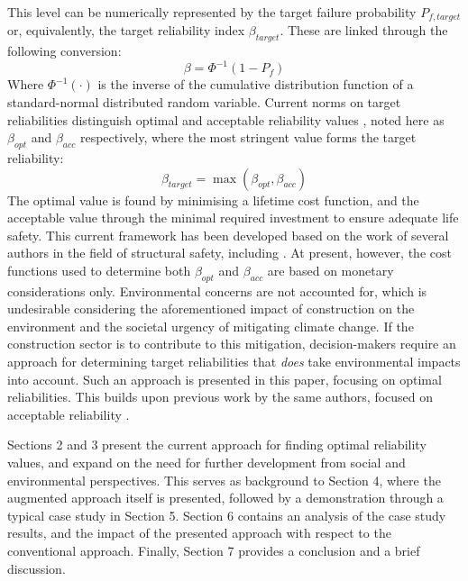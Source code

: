 This level can be numerically represented by the target failure probability $P_{f,target}$ or, equivalently, the target reliability index $\beta_{target}$.
These are linked through the following conversion:
\begin{equation}
\label{eqn:beta_Pf}
    \beta = \Phi^{-1}(1-P_f)
\end{equation}
Where $\Phi^{-1}(\cdot)$ is the inverse of the cumulative distribution function of a standard-normal distributed random variable.
Current norms on target reliabilities \citep{iso2394, EN1990} distinguish optimal and acceptable reliability values \citep{Fischer2019OptimalDesign}, noted here as $\beta_{opt}$ and $\beta_{acc}$ respectively, where the most stringent value forms the target reliability:
\begin{equation}
    \beta_{target} = \max(\beta_{opt}, \beta_{acc})
\end{equation}
The optimal value is found by minimising a lifetime cost function, and the acceptable value through the minimal required investment to ensure adequate life safety.
This current framework has been developed based on the work of several authors in the field of structural safety, including \citep{Rackwitz2000OptimizationVerification, Rackwitz2006TheCriteria, Rackwitz2008TheVerification, Viljoen2012DerivingLQI, Fischer2019OptimalDesign, Pandey2004LifeSafety, Pandey2024LifeStructures}.
At present, however, the cost functions used to determine both $\beta_{opt}$ and $\beta_{acc}$ are based on monetary considerations only.
Environmental concerns are not accounted for, which is undesirable considering the aforementioned impact of construction on the environment and the societal urgency of mitigating climate change.
If the construction sector is to contribute to this mitigation, decision-makers require an approach for determining target reliabilities that \emph{does} take environmental impacts into account.
Such an approach is presented in this paper, focusing on optimal reliabilities.
This builds upon previous work by the same authors, focused on acceptable reliability \citep{Knibbe2026PlaceHolder}. 

Sections 2 and 3 present the current approach for finding optimal reliability values, and expand on the need for further development from social and environmental perspectives.
This serves as background to Section 4, where the augmented approach itself is presented, followed by a demonstration through a typical case study in Section 5.
Section 6 contains an analysis of the case study results, and the impact of the presented approach with respect to the conventional approach.
Finally, Section 7 provides a conclusion and a brief discussion.
